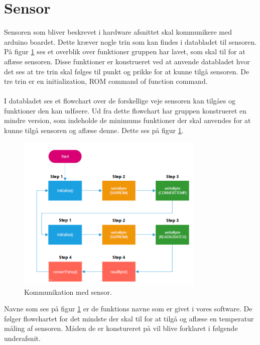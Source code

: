 \section{Sensor}
Sensoren som bliver beskrevet i hardware afsnittet skal kommunikere med arduino boardet. Dette kræver nogle trin som kan findes i databladet til sensoren. På figur \ref{sensor_kom} ses et overblik over funktioner gruppen har lavet, som skal til for at aflæse sensoren. Disse funktioner er konstrueret ved at anvende databladet hvor det ses at tre trin skal følges til punkt og prikke for at kunne tilgå sensoren. De tre trin er en initialization, ROM command of function command.
\\
\\
I databladet ses et flowchart over de forskellige veje sensoren kan tilgåes og funktioner den kan udføere. Ud fra dette flowchart har gruppen konstrueret en mindre version, som indeholde de minimums funktioner der skal anvendes for at kunne tilgå sensoren og aflæse denne. Dette ses på figur \ref{sensor_kom}.

\begin{figure}[h!]
  \centering
  \includegraphics[width=0.8\textwidth]{figures/sensor_communication.png}
  \caption{Kommunikation med sensor.}
  \label{sensor_kom}
\end{figure}

Navne som ses på figur \ref{sensor_kom} er de funktions navne som er givet i vores software. De følger flowchartet for det mindste der skal til for at tilgå og aflæse en temperatur måling af sensoren. Måden de er konstureret på vil blive forklaret i følgende underafsnit.


